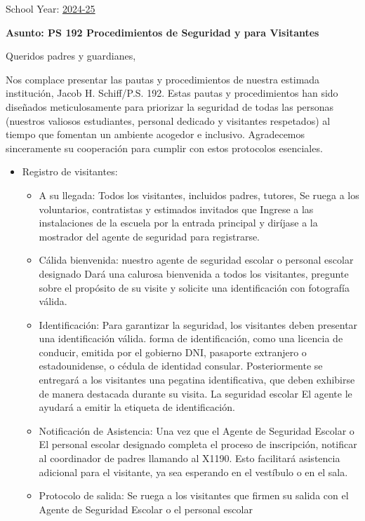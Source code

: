 \documentclass[12pt,letterpaper]{article}
\begin{document}
\vspace*{0.5in}
School Year: \href{https://www.ps192.org}{2024-25} 

\textbf{Asunto: PS 192 Procedimientos de Seguridad y para Visitantes}

Queridos padres y guardianes,

Nos complace presentar las pautas y procedimientos de nuestra estimada institución, Jacob H. Schiff/P.S. 192. Estas pautas y procedimientos han sido diseñados meticulosamente para priorizar la seguridad de todas las personas (nuestros valiosos estudiantes, personal dedicado y visitantes respetados) al tiempo que fomentan un ambiente acogedor e inclusivo. Agradecemos sinceramente su cooperación para cumplir con estos protocolos esenciales.
\begin{itemize}
	\item Registro de visitantes:
		\begin{itemize}
		\item A su llegada: Todos los visitantes, incluidos padres, tutores,
Se ruega a los voluntarios, contratistas y estimados invitados que Ingrese a las instalaciones de la escuela por la entrada principal y diríjase a la mostrador del agente de seguridad para registrarse.
		\item Cálida bienvenida: nuestro agente de seguridad escolar o personal escolar designado Dará una calurosa bienvenida a todos los visitantes, pregunte sobre el propósito de su visite y solicite una identificación con fotografía válida.
		\item Identificación: Para garantizar la seguridad, los visitantes deben presentar una identificación válida.
forma de identificación, como una licencia de conducir, emitida por el gobierno
DNI, pasaporte extranjero o estadounidense, o cédula de identidad consular.
Posteriormente se entregará a los visitantes una pegatina identificativa, que
deben exhibirse de manera destacada durante su visita. La seguridad escolar
El agente le ayudará a emitir la etiqueta de identificación.
		\item Notificación de Asistencia: Una vez que el Agente de Seguridad 
		Escolar o El personal escolar designado completa el proceso de 
		inscripción, notificar al coordinador de padres llamando al X1190. Esto facilitará asistencia adicional para el visitante, ya sea esperando en el vestíbulo o en el sala.
		\item Protocolo de salida: Se ruega a los visitantes que firmen su 
		salida con el Agente de Seguridad Escolar o el personal escolar 

\end{itemize}
\end{itemize}
\end{document}
